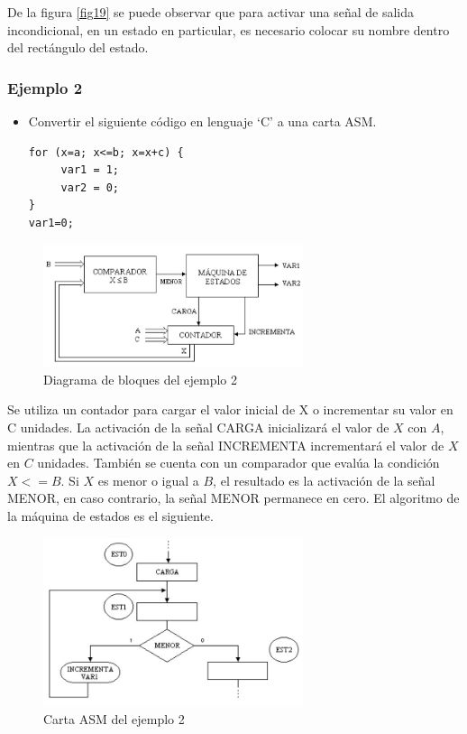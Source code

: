 \documentclass[12pt]{book}
\theoremstyle{definition}
\theoremstyle{remark}
\theoremstyle{plain}
\begin{document}
De la figura \ref{fig19} se puede observar que para activar una señal de salida incondicional, en un
estado en particular, es necesario colocar su nombre dentro del rectángulo del estado.

\subsubsection{Ejemplo 2}

\begin{itemize}
\item Convertir el siguiente código en lenguaje ‘C’ a una carta ASM.

\begin{verbatim}
for (x=a; x<=b; x=x+c) {
     var1 = 1;
     var2 = 0;
}
var1=0;

\end{verbatim}
\end{itemize}





\begin{figure}
\centering
\includegraphics[width=3in]{bloquesejemplo1b.jpg}
\caption{Diagrama de bloques  del ejemplo 2}
\label{fig20}
\end{figure}

Se utiliza un contador para cargar el valor inicial de X o incrementar su valor en C unidades. La
activación de la señal CARGA inicializará el valor de $X$ con $A$, mientras que la activación de la
señal INCREMENTA incrementará el valor de $X$ en $C$ unidades. También se cuenta con un
comparador que evalúa la condición $X <= B$. Si $X$ es menor o igual a $B$, el resultado es la activación
de la señal MENOR, en caso contrario, la señal MENOR permanece en cero.
El algoritmo de la máquina de estados es el siguiente.

\begin{figure}
\centering
\includegraphics[width=3in]{ASMejemplo2.jpg}
\caption{Carta ASM  del ejemplo 2}
\label{fig21}
\end{figure}
\end{document}
